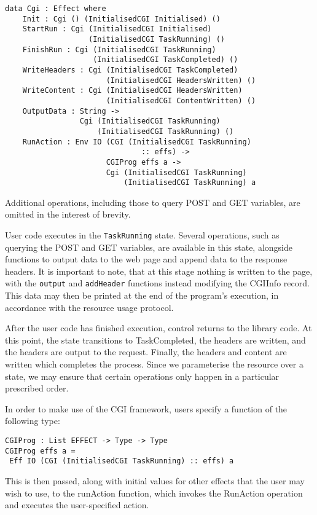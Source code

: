 \documentclass[preprint]{sigplanconf}
\begin{document}
{\small
\begin{verbatim}
data Cgi : Effect where
    Init : Cgi () (InitialisedCGI Initialised) ()
    StartRun : Cgi (InitialisedCGI Initialised) 
                   (InitialisedCGI TaskRunning) ()
    FinishRun : Cgi (InitialisedCGI TaskRunning) 
                    (InitialisedCGI TaskCompleted) ()
    WriteHeaders : Cgi (InitialisedCGI TaskCompleted) 
                       (InitialisedCGI HeadersWritten) ()
    WriteContent : Cgi (InitialisedCGI HeadersWritten) 
                       (InitialisedCGI ContentWritten) ()
    OutputData : String -> 
                 Cgi (InitialisedCGI TaskRunning) 
                     (InitialisedCGI TaskRunning) ()
    RunAction : Env IO (CGI (InitialisedCGI TaskRunning) 
                               :: effs) -> 
                       CGIProg effs a -> 
                       Cgi (InitialisedCGI TaskRunning) 
                           (InitialisedCGI TaskRunning) a
\end{verbatim}
}
Additional operations, including those to query POST and GET variables, are omitted in the interest of brevity.

User code executes in the \texttt{TaskRunning} state. Several operations, such as querying the POST and GET variables, are available in this state, alongside functions to output data to the web page and append data to the response headers. It is important to note, that at this stage nothing is written to the page, with the \texttt{output} and \texttt{addHeader} functions instead modifying the CGIInfo record. This data may then be printed at the end of the program's execution, in accordance with the resource usage protocol.

After the user code has finished execution, control returns to the library code. At this point, the state transitions to TaskCompleted, the headers are written, and the headers are output to the request. Finally, the headers and content are written which completes the process. Since we parameterise the resource over a state, we may ensure that certain operations only happen in a particular prescribed order.

In order to make use of the CGI framework, users specify a function of the following type:
{\small
\begin{verbatim}
CGIProg : List EFFECT -> Type -> Type
CGIProg effs a = 
 Eff IO (CGI (InitialisedCGI TaskRunning) :: effs) a
\end{verbatim}
}
This is then passed, along with initial values for other effects that the user may wish to use, to the runAction function, which invokes the RunAction operation and executes the user-specified action.
\end{document}
